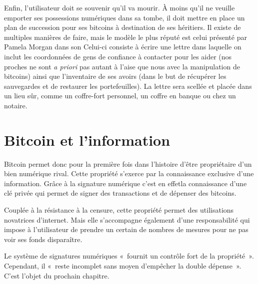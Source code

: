 Enfin, l'utilisateur doit se souvenir qu'il va mourir. À moins qu'il ne veuille emporter ses possessions numériques dans sa tombe, il doit mettre en place un plan de succession pour ses bitcoins à destination de ses héritiers. Il existe de multiples manières de faire, mais le modèle le plus réputé est celui présenté par Pamela Morgan dans son  Celui-ci consiste à écrire une lettre dans laquelle on inclut les coordonnées de gens de confiance à contacter pour les aider (nos proches ne sont \emph{a priori} pas autant à l'aise que nous avec la manipulation de bitcoins) ainsi que l'inventaire de ses avoirs (dans le but de récupérer les sauvegardes et de restaurer les portefeuilles). La lettre sera scellée et placée dans un lieu sûr, comme un coffre-fort personnel, un coffre en banque ou chez un notaire.

\section{Bitcoin et l'information}

Bitcoin permet donc pour la première fois dans l'histoire d'être propriétaire d'un bien numérique rival. Cette propriété s'exerce par la connaissance exclusive d'une information. Grâce à la signature numérique c'est en effetla connaissance d'une clé privée qui permet de signer des transactions et de dépenser des bitcoins.

Couplée à la résistance à la censure, cette propriété permet des utilisations novatrices d'internet. Mais elle s'accompagne également d'une responsabilité qui impose à l'utilisateur de prendre un certain de nombres de mesures pour ne pas voir ses fonds disparaître.

Le système de signatures numériques «~fournit un contrôle fort de la propriété~». Cependant, il «~reste incomplet sans moyen d'empêcher la double dépense~». C'est l'objet du prochain chapitre.

\printendnotes